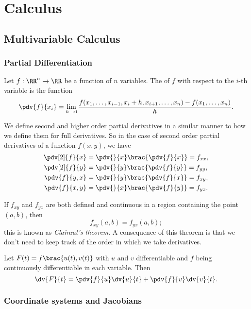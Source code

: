 \chapter{Calculus}
\section{Multivariable Calculus}
\subsection{Partial Differentiation}
\begin{definition}
Let $f:\RR^n\to\RR$ be a function of $n$ variables. The  of $f$ with respect to the $i$-th variable is the function
\[\pdv{f}{x_i}=\lim_{h\to0}\frac{f(x_1,\dots,x_{i-1},x_i+h,x_{i+1},\dots,x_n)-f(x_1,\dots,x_n)}{h}.\]
\end{definition}

\begin{notation}
We define second and higher order partial derivatives in a similar manner to how we define them for full derivatives. So in the case of second order partial derivatives of a function $f(x,y)$, we have
\begin{align*}
\pdv[2]{f}{x}&=\pdv{}{x}\brac{\pdv{f}{x}}=f_{xx},\\
\pdv[2]{f}{y}&=\pdv{}{y}\brac{\pdv{f}{y}}=f_{yy},\\
\pdv{f}{y,x}&=\pdv{}{y}\brac{\pdv{f}{x}}=f_{xy},\\
\pdv{f}{x,y}&=\pdv{}{x}\brac{\pdv{f}{y}}=f_{yx}.
\end{align*}
\end{notation}

If $f_{xy}$ and $f_{yx}$ are both defined and continuous in a region containing the point $(a,b)$, then 
\[f_{xy}(a,b)=f_{yx}(a,b);\]
this is known as \emph{Clairaut's theorem}. A consequence of this theorem is that we don't need to keep track of the order in which we take derivatives.

\begin{theorem}
Let $F(t)=f\brac{u(t),v(t)}$ with $u$ and $v$ differentiable and $f$ being continuously differentiable in each variable. Then
\begin{equation}
\dv{F}{t}=\pdv{f}{u}\dv{u}{t}+\pdv{f}{v}\dv{v}{t}.
\end{equation}
\end{theorem}



\subsection{Coordinate systems and Jacobians}
